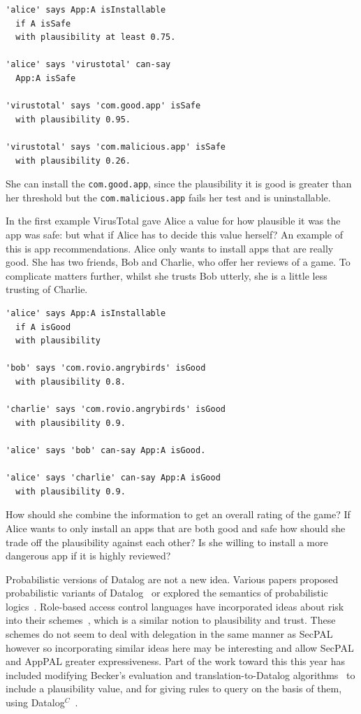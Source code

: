 \documentclass[thesis.tex]{subfiles}
\begin{document}
\begin{lstlisting}
'alice' says App:A isInstallable
  if A isSafe
  with plausibility at least 0.75.

'alice' says 'virustotal' can-say
  App:A isSafe

'virustotal' says 'com.good.app' isSafe
  with plausibility 0.95.

'virustotal' says 'com.malicious.app' isSafe
  with plausibility 0.26.
\end{lstlisting}

She can install the \texttt{com.good.app}, since the plausibility it is good is
greater than her threshold but the \texttt{com.malicious.app} fails her test and
is uninstallable. 

In the first example VirusTotal gave Alice a value for how plausible it was the
app was safe: but what if Alice has to decide this value herself? An example of
this is app recommendations. Alice only wants to install apps that are really
good. She has two friends, Bob and Charlie, who offer her reviews of a game. To
complicate matters further, whilst she trusts Bob utterly, she is a little less
trusting of Charlie.

\begin{lstlisting}
'alice' says App:A isInstallable
  if A isGood
  with plausibility

'bob' says 'com.rovio.angrybirds' isGood
  with plausibility 0.8.

'charlie' says 'com.rovio.angrybirds' isGood
  with plausibility 0.9.

'alice' says 'bob' can-say App:A isGood.

'alice' says 'charlie' can-say App:A isGood
  with plausibility 0.9.
\end{lstlisting}

How should she combine the information to get an overall rating of the game? If
Alice wants to only install an apps that are both good and safe how should she
trade off the plausibility against each other? Is she willing to install a more
dangerous app if it is highly reviewed?



Probabilistic versions of Datalog are not a new idea.  Various papers proposed
probabilistic variants of Datalog~\cite{fuhr_probabilistic_1995} or explored the
semantics of probabilistic logics~\cite{halpern_analysis_1990}.  Role-based
access control languages have incorporated ideas about risk into their
schemes~\cite{josang_analysing_2004,dimmock_using_2004,salim_approach_2011},
which is a similar notion to plausibility and trust.  These schemes do not seem
to deal with delegation in the same manner as SecPAL however so incorporating
similar ideas here may be interesting and allow SecPAL and AppPAL greater
expressiveness.  Part of the work toward this this year has included modifying Becker's
evaluation and translation-to-Datalog algorithms~\cite{becker_secpal:_2010} to
include a plausibility value, and for giving rules to query on the basis of
them, using Datalog$^C$~\cite{li_datalog_2003}.
\end{document}
